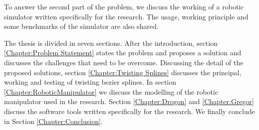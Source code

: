 {    To answer the second part of the problem, we discuss the working of a robotic simulator written specifically for the research. The usage, working principle and some benchmarks of the simulator are also shared.
    
    The thesis is divided in seven sections. After the introduction, section \ref{Chapter:Problem Statement} states the problem and proposes a solution and discusses the challenges that need to be overcome. Discussing the detail of the proposed solutions, section \ref{Chapter:Twisting Splines} discusses the principal, working and testing of twisting bezier splines. In section \ref{Chapter:RoboticManipulator} we discuss the modelling of the robotic manipulator used in the research. Section \ref{Chapter:Drogon} and \ref{Chapter:Gregor} discuss the software tools written specifically for the research. We finally conclude in Section \ref{Chapter:Conclusion}.
} 